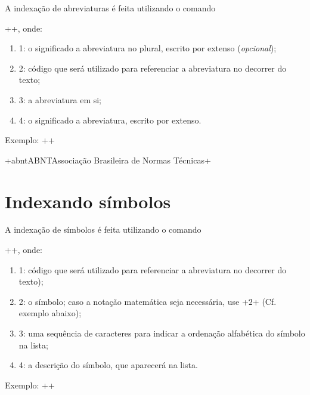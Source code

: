 \documentclass[xindy,rascunho]{fei}
\begin{document}
\begin{teorema}
	A indexação de abreviaturas é feita utilizando o comando
	
	\latexinline++, onde:
	
	\begin{enumerate}
	\item 1: o significado a abreviatura no plural, escrito por extenso (\emph{opcional});
	\item 2: código que será utilizado para referenciar a abreviatura no decorrer do texto;
	\item 3: a abreviatura em si;
	\item 4: o significado a abreviatura, escrito por extenso.
	\end{enumerate}
	
	Exemplo: \latexinline+\newacronym[longplural=Associações+
	
			 \latexinline+Brasileiras de Normas Técnicas]+
			 
			 \latexinline+{abnt}{ABNT}{Associação Brasileira de Normas Técnicas}+
			 
	\section{Indexando símbolos}
	
	A indexação de símbolos é feita utilizando o comando
	
	\latexinline++, onde:
	
	\begin{enumerate}
	\item 1: código que será utilizado para referenciar a abreviatura no decorrer do texto);
	\item 2: o símbolo; caso a notação matemática seja necessária, use \latexinline+\ensuremath{2}+ (Cf. exemplo abaixo);
	\item 3: uma sequência de caracteres para indicar a ordenação alfabética do símbolo na lista;
	\item 4: a descrição do símbolo, que aparecerá na lista.
	\end{enumerate}
	
	Exemplo: \latexinline++


\end{teorema}
\end{document}
